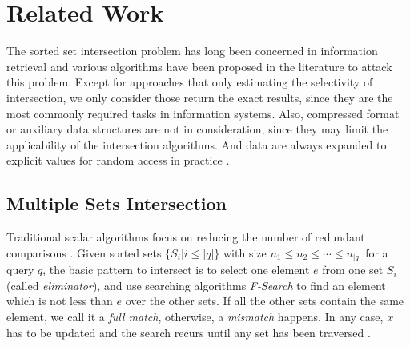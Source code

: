 \documentclass[runningheads,a4paper]{llncs}
\begin{document}
\section{Related Work}\label{sec:related work}
The sorted set intersection problem has long been concerned in information retrieval and various algorithms have been proposed in the literature to attack this problem.
Except for approaches that only estimating the selectivity of intersection, we only consider those return the exact results, since they are the most commonly required tasks in information systems.
Also, compressed format or auxiliary data structures are not in consideration, since they may limit the applicability of the intersection algorithms.
And data are always expanded to explicit values for random access in practice \cite{Culpepper2007Compact,Sanders2007Intersection}.
\subsection{Multiple Sets Intersection}\label{sec: msis}
Traditional scalar algorithms focus on reducing the number of redundant comparisons \cite{Demaine2001Experiments,Barbay2006Faster,Inoue2014Faster,Schlegel2011Fast}.
Given sorted sets $ \{S_i|i\leqslant\lvert q \rvert\} $ with size $ n_1\leqslant n_2\leqslant\cdots\leqslant n_{\lvert q\rvert} $ for a query $ q $, the basic pattern to intersect is to select one element $ e $ from one set $ S_i $ (called \textit{eliminator}), and use searching algorithms \textit{F-Search} to find an element which is not less than $ e $ over the other sets.
If all the other sets contain the same element, we call it a \textit{full match}, otherwise, a \textit{mismatch} happens.
In any case, $ x $ has to be updated and the search recurs until any set has been traversed \cite{culpepper2010efficient}.
\end{document}
